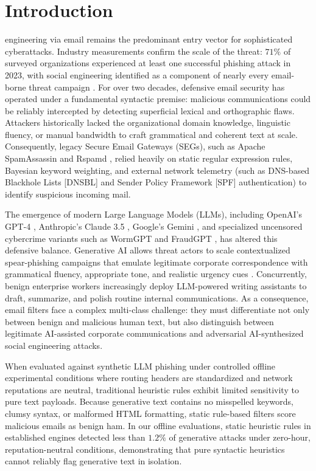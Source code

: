 \documentclass[journal]{IEEEtran}
\begin{document}
\IEEEpeerreviewmaketitle

\section{Introduction}
 engineering via email remains the predominant entry vector for sophisticated cyberattacks. Industry measurements confirm the scale of the threat: $71\%$ of surveyed organizations experienced at least one successful phishing attack in 2023, with social engineering identified as a component of nearly every email-borne threat campaign \cite{proofpoint2024har, salloum2022, gupta2023chatgpt}. For over two decades, defensive email security has operated under a fundamental syntactic premise: malicious communications could be reliably intercepted by detecting superficial lexical and orthographic flaws. Attackers historically lacked the organizational domain knowledge, linguistic fluency, or manual bandwidth to craft grammatical and coherent text at scale. Consequently, legacy Secure Email Gateways (SEGs), such as Apache SpamAssassin \cite{spamassassin2004} and Rspamd \cite{stakhov2020rspamd}, relied heavily on static regular expression rules, Bayesian keyword weighting, and external network telemetry (such as DNS-based Blackhole Lists [DNSBL] and Sender Policy Framework [SPF] authentication) to identify suspicious incoming mail.

The emergence of modern Large Language Models (LLMs), including OpenAI's GPT-4 \cite{openai2023gpt4}, Anthropic's Claude 3.5 \cite{anthropic2024claude}, Google's Gemini \cite{gemini2023team}, and specialized uncensored cybercrime variants such as WormGPT and FraudGPT \cite{afane2024, roy2024}, has altered this defensive balance. Generative AI allows threat actors to scale contextualized spear-phishing campaigns that emulate legitimate corporate correspondence with grammatical fluency, appropriate tone, and realistic urgency cues \cite{hazell2023large, krishna2023}. Concurrently, benign enterprise workers increasingly deploy LLM-powered writing assistants to draft, summarize, and polish routine internal communications. As a consequence, email filters face a complex multi-class challenge: they must differentiate not only between benign and malicious human text, but also distinguish between legitimate AI-assisted corporate communications and adversarial AI-synthesized social engineering attacks.


When evaluated against synthetic LLM phishing under controlled offline experimental conditions where routing headers are standardized and network reputations are neutral, traditional heuristic rules exhibit limited sensitivity to pure text payloads. Because generative text contains no misspelled keywords, clumsy syntax, or malformed HTML formatting, static rule-based filters score malicious emails as benign ham. In our offline evaluations, static heuristic rules in established engines detected less than $1.2\%$ of generative attacks under zero-hour, reputation-neutral conditions, demonstrating that pure syntactic heuristics cannot reliably flag generative text in isolation.
\end{document}
